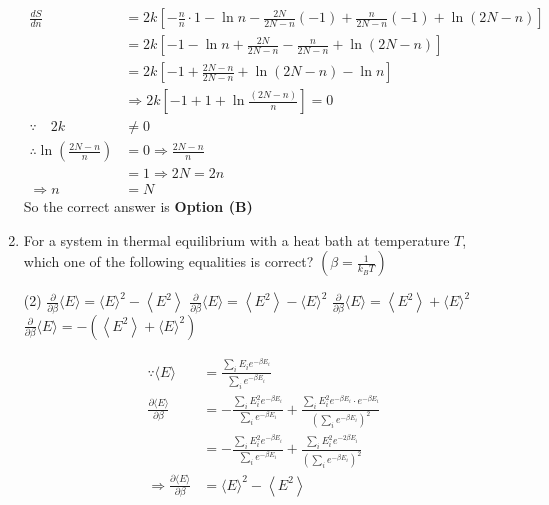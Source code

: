 \begin{enumerate}
\begin{answer}
\begin{align*}
		\frac{d S}{d n}&=2 k\left[-\frac{n}{n} \cdot 1-\ln n-\frac{2 N}{2 N-n}(-1)+\frac{n}{2 N-n}(-1)+\ln (2 N-n)\right]\\
		&=2 k\left[-1-\ln n+\frac{2 N}{2 N-n}-\frac{n}{2 N-n}+\ln (2 N-n)\right]\\
		&=2 k\left[-1+\frac{2 N-n}{2 N-n}+\ln (2 N-n)-\ln n\right]\\& \Rightarrow 2 k\left[-1+1+\ln \frac{(2 N-n)}{n}\right]=0\\
		\because \quad 2 k &\neq 0\\
		\therefore \ln \left(\frac{2 N-n}{n}\right)&=0 \Rightarrow \frac{2 N-n}{n}\\&=1 \Rightarrow 2 N=2 n \\
		\Rightarrow n&=N
		\end{align*}
		So the correct answer is \textbf{Option (B)}
	\end{answer}	
	\item For a system in thermal equilibrium with a heat bath at temperature $T$, which one of the following equalities is correct? $\left(\beta=\frac{1}{k_{B} T}\right)$
	{}
	\begin{tasks}(2)
		\task[\textbf{A.}] $\frac{\partial}{\partial \beta}\langle E\rangle=\langle E\rangle^{2}-\left\langle E^{2}\right\rangle$
		\task[\textbf{B.}] $\frac{\partial}{\partial \beta}\langle E\rangle=\left\langle E^{2}\right\rangle-\langle E\rangle^{2}$
		\task[\textbf{C.}] $\frac{\partial}{\partial \beta}\langle E\rangle=\left\langle E^{2}\right\rangle+\langle E\rangle^{2}$
		\task[\textbf{D.}] $\frac{\partial}{\partial \beta}\langle E\rangle=-\left(\left\langle E^{2}\right\rangle+\langle E\rangle^{2}\right)$
	\end{tasks}
	\begin{answer}
		\begin{align*}
		\because\langle E\rangle&=\frac{\sum_{i} E_{i} e^{-\beta E_{i}}}{\sum_{i} e^{-\beta E_{i}}}\\
		\frac{\partial\langle E\rangle}{\partial \beta}&=-\frac{\sum_{i} E_{i}^{2} e^{-\beta E_{i}}}{\sum_{i} e^{-\beta E_{i}}}+\frac{\sum_{i} E_{i}^{2} e^{-\beta E_{i}} \cdot e^{-\beta E_{i}}}{\left(\sum_{i} e^{-\beta E_{i}}\right)^{2}}\\&=-\frac{\sum_{i} E_{i}^{2} e^{-\beta E_{i}}}{\sum_{i} e^{-\beta E_{i}}}+\frac{\sum_{i} E_{i}^{2} e^{-2 \beta E_{i}}}{\left(\sum_{i} e^{-\beta E_{i}}\right)^{2}}\\
		\Rightarrow \frac{\partial\langle E\rangle}{\partial \beta}&=\langle E\rangle^{2}-\left\langle E^{2}\right\rangle

\end{align*}
\end{answer}
\end{enumerate}
